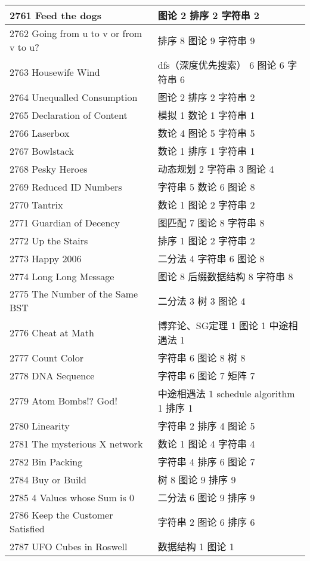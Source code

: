 \begin{longtable}{| p{} | p{} |}
 2761 Feed the dogs  & 图论 2 排序 2 字符串 2 \\ \hline
 2762 Going from u to v or from v to u?  & 排序 8 图论 9 字符串 9 \\ \hline
 2763 Housewife Wind  & dfs（深度优先搜索） 6 图论 6 字符串 6 \\ \hline
 2764 Unequalled Consumption  & 图论 2 排序 2 字符串 2 \\ \hline
 2765 Declaration of Content  & 模拟 1 数论 1 字符串 1 \\ \hline
 2766 Laserbox  & 数论 4 图论 5 字符串 5 \\ \hline
 2767 Bowlstack  & 数论 1 排序 1 字符串 1 \\ \hline
 2768 Pesky Heroes  & 动态规划 2 字符串 3 图论 4 \\ \hline
 2769 Reduced ID Numbers  & 字符串 5 数论 6 图论 8 \\ \hline
 2770 Tantrix  & 数论 1 图论 2 字符串 2 \\ \hline
 2771 Guardian of Decency  & 图匹配 7 图论 8 字符串 8 \\ \hline
 2772 Up the Stairs  & 排序 1 图论 2 字符串 2 \\ \hline
 2773 Happy 2006  & 二分法 4 字符串 6 图论 8 \\ \hline
 2774 Long Long Message  & 图论 8 后缀数据结构 8 字符串 8 \\ \hline
 2775 The Number of the Same BST  & 二分法 3 树 3 图论 4 \\ \hline
 2776 Cheat at Math  & 博弈论、SG定理 1 图论 1 中途相遇法 1 \\ \hline
 2777 Count Color  & 字符串 6 图论 8 树 8 \\ \hline
 2778 DNA Sequence  & 字符串 6 图论 7 矩阵 7 \\ \hline
 2779 Atom Bombs!? God!  & 中途相遇法 1 schedule algorithm 1 排序 1 \\ \hline
 2780 Linearity  & 字符串 2 排序 4 图论 5 \\ \hline
 2781 The mysterious X network  & 数论 1 图论 4 字符串 4 \\ \hline
 2782 Bin Packing  & 字符串 4 排序 6 图论 7 \\ \hline
 2784 Buy or Build  & 树 8 图论 9 排序 9 \\ \hline
 2785 4 Values whose Sum is 0  & 二分法 6 图论 9 排序 9 \\ \hline
 2786 Keep the Customer Satisfied  & 字符串 2 图论 6 排序 6 \\ \hline
 2787 UFO Cubes in Roswell  & 数据结构 1 图论 1 \\ \hline

\end{longtable}

